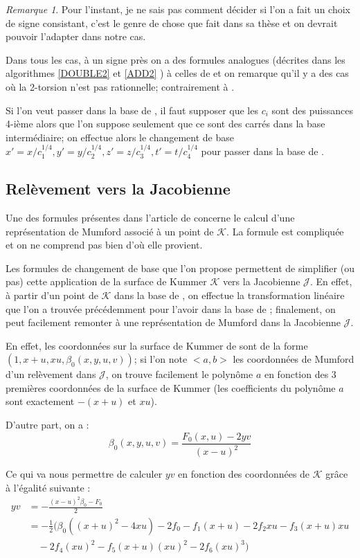 \documentclass[a4paper]{article}
\theoremstyle{definition}
\theoremstyle{remark}
\newtheorem{remarque}{Remarque}
\numberwithin{equation}{section}
\begin{document}
\begin{remarque}
Pour l'instant, je ne sais pas comment décider si l'on a fait un choix de signe consistant, c'est le genre de chose que fait \citet{cosset} dans sa thèse et on devrait pouvoir l'adapter dans notre cas.
\end{remarque}

Dans tous les cas, à un signe près on a des formules analogues (décrites dans les algorithmes \ref{DOUBLE2} et \ref{ADD2} ) à celles de \citep{gaudry} et on remarque qu'il y a des cas où la 2-torsion n'est pas rationnelle; contrairement à \citep{gaudry}.

Si l'on veut passer dans la base de \citet{gaudry}, il faut supposer que les $c_i$ sont des puissances 4-ième alors que l'on suppose seulement que ce sont des carrés dans la base intermédiaire; on effectue alors le changement de base $x'=x/c_1^{1/4},y'=y/c_2^{1/4},z'=z/c_3^{1/4},t'=t/c_4^{1/4}$ pour passer dans la base de \citet{gaudry}.

\subsection{Relèvement vers la Jacobienne}
Une des formules présentes dans l'article de \citep{gaudry} concerne le calcul d'une représentation de Mumford associé à un point de $\mathcal{K}$. La formule est compliquée et on ne comprend pas bien d'où elle provient.

Les formules de changement de base que l'on propose permettent de simplifier (ou pas) cette application de la surface de Kummer $\mathcal{K}$ vers la Jacobienne $\mathcal{J}$. En effet, à partir d'un point de $\mathcal{K}$ dans la base de \citet{gaudry}, on effectue la transformation linéaire que l'on a trouvée précédemment pour l'avoir dans la base de \citet{cassels-Flynn}; finalement, on peut facilement remonter à une représentation de Mumford dans la Jacobienne $\mathcal{J}$.

En effet, les coordonnées sur la surface de Kummer de \citet{cassels-Flynn} sont de la forme $(1,x+u,xu,\beta_0(x,y,u,v))$; si l'on note $<a,b>$ les coordonnées de Mumford d'un relèvement dans $\mathcal{J}$, on trouve facilement le polynôme $a$ en fonction des 3 premières coordonnées de la surface de Kummer (les coefficients du polynôme $a$ sont exactement $-(x+u)$ et $xu$).

D'autre part, on a :
$$\beta_0(x,y,u,v) = \frac{F_0(x,u)-2yv}{(x-u)^2}$$

Ce qui va nous permettre de calculer $yv$ en fonction des coordonnées de $\mathcal{K}$ grâce à l'égalité suivante :
\begin{align*}
yv &= -\frac{(x-u)^2\beta_0 - F_0}{2} \\
   &= -\frac{1}{2}(\beta_0((x+u)^2-4xu) - 2f_0 - f_1(x+u) - 2f_2xu - f_3(x+u)xu \\
   & \quad - 2f_4(xu)^2 - f_5(x+u)(xu)^2 - 2f_6(xu)^3)
\end{align*}
\end{document}
